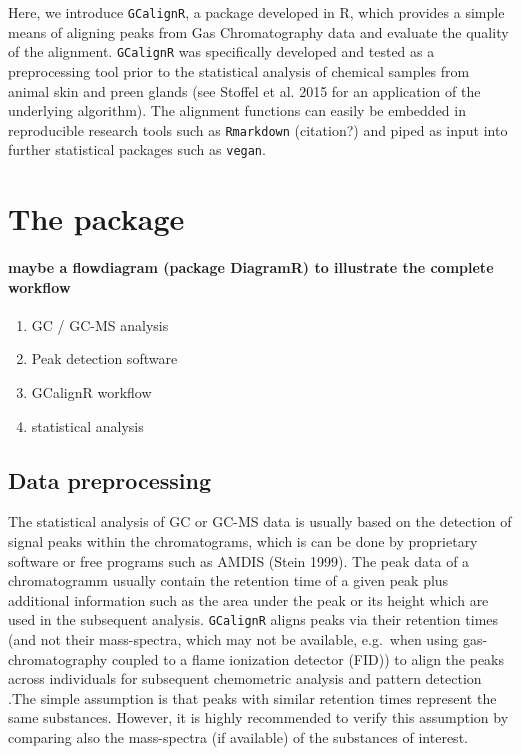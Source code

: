 \documentclass[]{article}
\providecommand{\tightlist}{%
  \setlength{\itemsep}{0pt}\setlength{\parskip}{0pt}}
\let\oldparagraph\paragraph
\renewcommand{\paragraph}[1]{\oldparagraph{#1}\mbox{}}
\begin{document}
Here, we introduce \texttt{GCalignR}, a package developed in R, which
provides a simple means of aligning peaks from Gas Chromatography data
and evaluate the quality of the alignment. \texttt{GCalignR} was
specifically developed and tested as a preprocessing tool prior to the
statistical analysis of chemical samples from animal skin and preen
glands (see Stoffel et al. 2015 for an application of the underlying
algorithm). The alignment functions can easily be embedded in
reproducible research tools such as \texttt{Rmarkdown} (citation?) and
piped as input into further statistical packages such as \texttt{vegan}.

\section{The package}\label{the-package}

\paragraph{maybe a flowdiagram (package DiagramR) to illustrate the
complete
workflow}\label{maybe-a-flowdiagram-package-diagramr-to-illustrate-the-complete-workflow}

\begin{enumerate}
\def\labelenumi{\arabic{enumi}.}
\tightlist
\item
  GC / GC-MS analysis
\item
  Peak detection software
\item
  GCalignR workflow
\item
  statistical analysis
\end{enumerate}

\subsection{Data preprocessing}\label{data-preprocessing}

The statistical analysis of GC or GC-MS data is usually based on the
detection of signal peaks within the chromatograms, which is can be done
by proprietary software or free programs such as AMDIS (Stein 1999). The
peak data of a chromatogramm usually contain the retention time of a
given peak plus additional information such as the area under the peak
or its height which are used in the subsequent analysis.
\texttt{GCalignR} aligns peaks via their retention times (and not their
mass-spectra, which may not be available, e.g.~when using
gas-chromatography coupled to a flame ionization detector (FID)) to
align the peaks across individuals for subsequent chemometric analysis
and pattern detection .The simple assumption is that peaks with similar
retention times represent the same substances. However, it is highly
recommended to verify this assumption by comparing also the mass-spectra
(if available) of the substances of interest.
\end{document}
